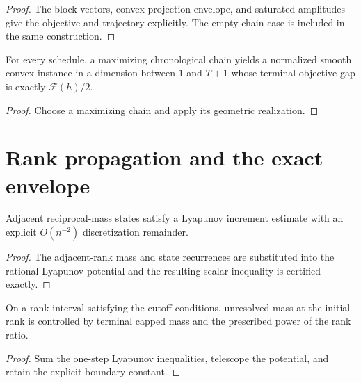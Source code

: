 \begin{proof}
  \leanok
  The block vectors, convex projection envelope, and saturated amplitudes
  give the objective and trajectory explicitly.  The empty-chain case is
  included in the same construction.
\end{proof}

\begin{corollary}
  \label{cor:functional-attainment}
  \leanok
  For every schedule, a maximizing chronological chain yields a normalized
  smooth convex instance in a dimension between $1$ and $T+1$ whose terminal
  objective gap is exactly $\mathcal F(h)/2$.
\end{corollary}

\begin{proof}
  \leanok
  Choose a maximizing chain and apply its geometric realization.
\end{proof}

\section{Rank propagation and the exact envelope}

\begin{lemma}
  \label{lem:one-step-lyapunov}
  \leanok
  Adjacent reciprocal-mass states satisfy a Lyapunov increment estimate with
  an explicit $O(n^{-2})$ discretization remainder.
\end{lemma}

\begin{proof}
  \leanok
  The adjacent-rank mass and state recurrences are substituted into the
  rational Lyapunov potential and the resulting scalar inequality is
  certified exactly.
\end{proof}

\begin{theorem}
  \label{thm:boundary-propagation}
  \leanok
  On a rank interval satisfying the cutoff conditions, unresolved mass at
  the initial rank is controlled by terminal capped mass and the prescribed
  power of the rank ratio.
\end{theorem}

\begin{proof}
  \leanok
  Sum the one-step Lyapunov inequalities, telescope the potential, and retain
  the explicit boundary constant.
\end{proof}

